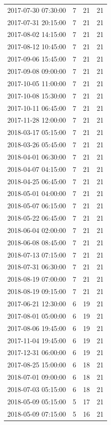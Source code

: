 \begin{tabular}{lrrr}
2017-07-30 07:30:00 & 7 & 21 & 21 \\
2017-07-31 20:15:00 & 7 & 21 & 21 \\
2017-08-02 14:15:00 & 7 & 21 & 21 \\
2017-08-12 10:45:00 & 7 & 21 & 21 \\
2017-09-06 15:45:00 & 7 & 21 & 21 \\
2017-09-08 09:00:00 & 7 & 21 & 21 \\
2017-10-05 11:00:00 & 7 & 21 & 21 \\
2017-10-08 15:30:00 & 7 & 21 & 21 \\
2017-10-11 06:45:00 & 7 & 21 & 21 \\
2017-11-28 12:00:00 & 7 & 21 & 21 \\
2018-03-17 05:15:00 & 7 & 21 & 21 \\
2018-03-26 05:45:00 & 7 & 21 & 21 \\
2018-04-01 06:30:00 & 7 & 21 & 21 \\
2018-04-07 04:15:00 & 7 & 21 & 21 \\
2018-04-25 06:45:00 & 7 & 21 & 21 \\
2018-05-01 04:00:00 & 7 & 21 & 21 \\
2018-05-07 06:15:00 & 7 & 21 & 21 \\
2018-05-22 06:45:00 & 7 & 21 & 21 \\
2018-06-04 02:00:00 & 7 & 21 & 21 \\
2018-06-08 08:45:00 & 7 & 21 & 21 \\
2018-07-13 07:15:00 & 7 & 21 & 21 \\
2018-07-31 06:30:00 & 7 & 21 & 21 \\
2018-08-19 07:00:00 & 7 & 21 & 21 \\
2018-08-19 09:15:00 & 7 & 21 & 21 \\
2017-06-21 12:30:00 & 6 & 19 & 21 \\
2017-08-01 05:00:00 & 6 & 19 & 21 \\
2017-08-06 19:45:00 & 6 & 19 & 21 \\
2017-11-04 19:45:00 & 6 & 19 & 21 \\
2017-12-31 06:00:00 & 6 & 19 & 21 \\
2017-08-25 15:00:00 & 6 & 18 & 21 \\
2018-07-01 09:00:00 & 6 & 18 & 21 \\
2018-07-03 05:15:00 & 6 & 18 & 21 \\
2018-05-09 05:15:00 & 5 & 17 & 21 \\
2018-05-09 07:15:00 & 5 & 16 & 21 \\

\end{tabular}

